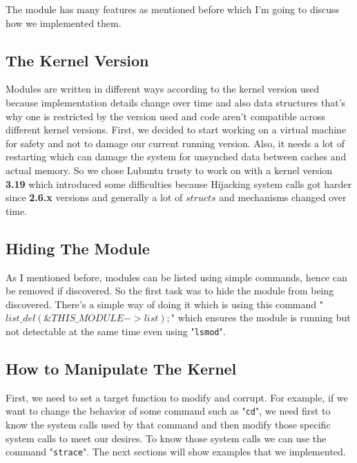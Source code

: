 \documentclass[12pt]{article}
\begin{document}
	 The module has many features as mentioned before which I'm going to discuss how we implemented them.
	 \subsection{The Kernel Version}
	 Modules are written in different ways according to the kernel version used because implementation details change over time and also data structures that's why one is restricted by the version used and code aren't compatible across different kernel versions.
	 First, we decided to start working on a virtual machine for safety and not to damage our current running version. Also, it needs a lot of restarting which can damage the system for unsynched data between caches and actual memory. So we chose Lubuntu trusty to work on with a kernel version \textbf{3.19} which introduced some difficulties because Hijacking system calls got harder since \textbf{2.6.x} versions and generally a lot of $structs$ and mechanisms changed over time.
	 \subsection{Hiding The Module}
	 As I mentioned before, modules can be listed using simple commands, hence can be removed if discovered. So the first task was to hide the module from being discovered. There's a simple way of doing it which is using this command "$list\_del (\& THIS\_MODULE ->list);$" which ensures the module is running but not detectable at the same time even using "\lstinline|lsmod|". 
	 \subsection{How to Manipulate The Kernel}
	 First, we need to set a target function to modify and corrupt. For example, if we want to change the behavior of some command such as "\lstinline|cd|", we need first to know the system calls used by that command and then modify those specific system calls to meet our desires. To know those system calls we can use the command "\lstinline|strace|". The next sections will show examples that we implemented.
\end{document}
